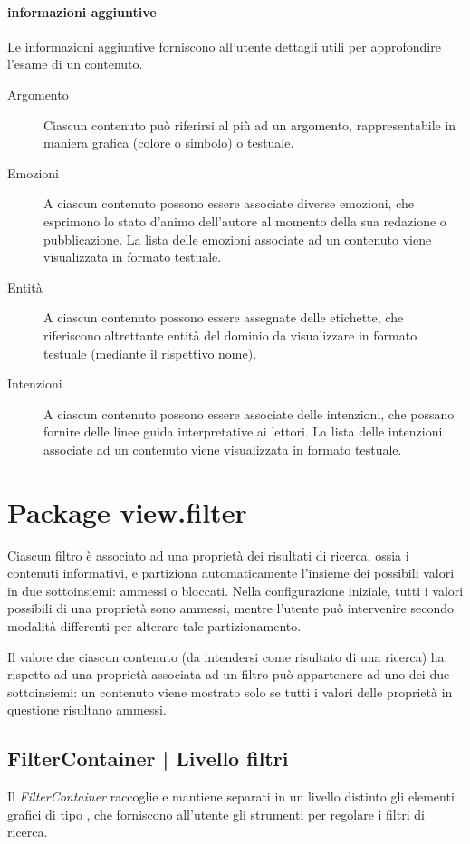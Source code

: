 \documentclass[10pt,a4paper,headinclude,footinclude,hidelinks]{scrreprt} %
\begin{document}
	\paragraph{informazioni aggiuntive} Le informazioni aggiuntive forniscono all'utente dettagli utili per approfondire l'esame di un contenuto.
	\begin{description}
	\item[Argomento] Ciascun contenuto può riferirsi al più ad un argomento, rappresentabile in maniera grafica (colore o simbolo) o testuale.
	\item[Emozioni] A ciascun contenuto possono essere associate diverse emozioni, che esprimono lo stato d'animo dell'autore al momento della sua redazione o pubblicazione. La lista delle emozioni associate ad un contenuto viene visualizzata in formato testuale.
	\item[Entit\`a] A ciascun contenuto possono essere assegnate delle etichette, che riferiscono altrettante entità del dominio da visualizzare in formato testuale (mediante il rispettivo nome).
	\item[Intenzioni] A ciascun contenuto possono essere associate delle intenzioni, che possano fornire delle linee guida interpretative ai lettori. La lista delle intenzioni associate ad un contenuto viene visualizzata in formato testuale.
	\end{description}

	\section{Package view.filter}
	\label{sec:stage:design:sistema:view.filter}
	Ciascun filtro è associato ad una proprietà dei risultati di ricerca, ossia i contenuti informativi, e partiziona automaticamente l'insieme dei possibili valori in due sottoinsiemi: ammessi o bloccati. Nella configurazione iniziale, tutti i valori possibili di una proprietà sono ammessi, mentre l'utente può intervenire secondo modalità differenti per alterare tale partizionamento.
	
	Il valore che ciascun contenuto (da intendersi come risultato di una ricerca) ha rispetto ad una proprietà associata ad un filtro può appartenere ad uno dei due sottoinsiemi: un contenuto viene mostrato solo se tutti i valori delle proprietà in questione risultano ammessi.

	\subsection[FilterContainer]{FilterContainer | Livello filtri}
	Il \textit{FilterContainer} raccoglie e mantiene separati in un livello distinto gli elementi grafici di tipo \textit{}, che forniscono all'utente gli strumenti per regolare i filtri di ricerca.
	
\end{document}
